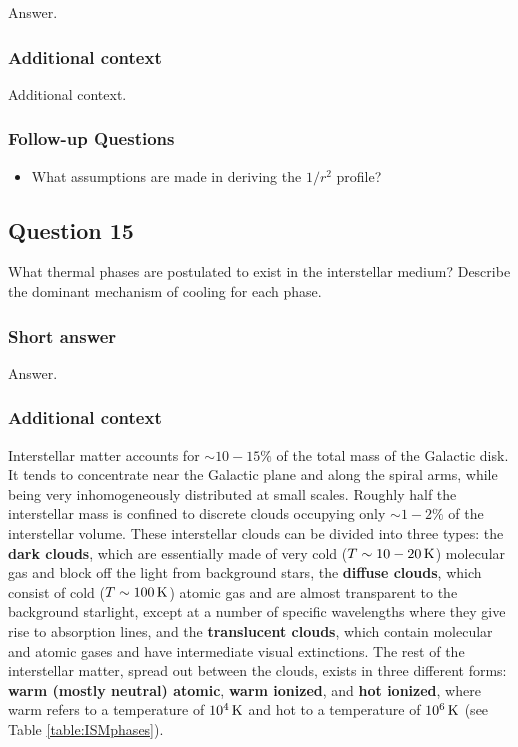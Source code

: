 \documentclass[a4paper,10pt]{article}
\begin{document}
Answer.

\subsubsection{Additional context}

Additional context.

\subsubsection{Follow-up Questions}

\begin{itemize}
    \item What assumptions are made in deriving the $1/r^2$ profile?
\end{itemize}


\newpage
\subsection{Question 15}

What thermal phases are postulated to exist in the interstellar medium? Describe the dominant mechanism of cooling for each phase.

\subsubsection{Short answer}

Answer.

\subsubsection{Additional context}

Interstellar matter accounts for $\sim10-15\%$ of the total
mass of the Galactic disk. It tends to concentrate near the Galactic plane and along the spiral arms, while being very inhomogeneously distributed at small scales. Roughly half the interstellar mass is confined to discrete clouds occupying only $\sim1-2\%$ of the interstellar volume. These interstellar clouds can be divided into three types: the \textbf{dark clouds}, which are essentially made of very cold ($T\sim10-20\,{\rm K}$) molecular gas and block off the light from background stars, the \textbf{diffuse clouds}, which consist of cold ($T\sim100\,{\rm K}$) atomic gas and are almost transparent to the background starlight, except at a number of specific wavelengths where they give rise to absorption lines, and the \textbf{translucent clouds}, which contain molecular and atomic gases and have intermediate visual extinctions. The rest of the interstellar matter, spread out between the clouds, exists in three different forms: \textbf{warm (mostly neutral) atomic}, \textbf{warm ionized}, and \textbf{hot ionized}, where warm refers to a temperature of $10^4\,{\rm K}$ and hot to a temperature of $10^6\,{\rm K}$ (see Table \ref{table:ISMphases}).
\end{document}
